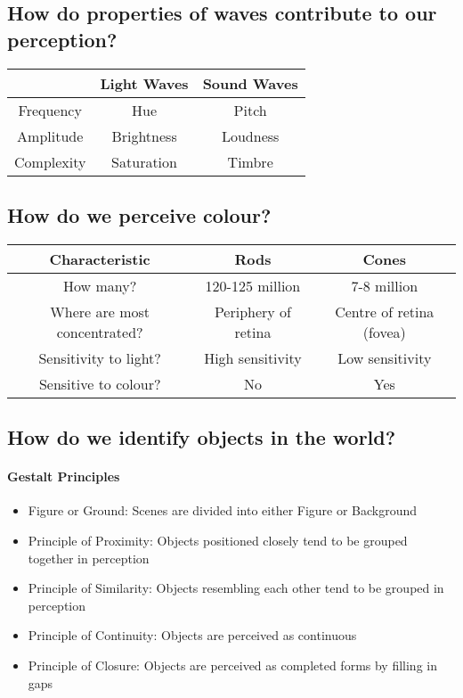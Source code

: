 \documentclass[10pt,letter]{article}
\theoremstyle{plain}
\theoremstyle{definition}
\begin{document}
\subsection*{How do properties of waves contribute to our perception?}
\begin{tabular}{|c|cc|}
\hline
&Light Waves&Sound Waves\\\hline 
Frequency & Hue & Pitch \\ 
Amplitude & Brightness & Loudness \\ 
Complexity & Saturation & Timbre\\
\hline
\end{tabular}

\subsection*{How do we perceive colour?}
\begin{tabular}{|c|cc|}
\hline
Characteristic & Rods & Cones\\\hline 
How many? & 120-125 million & 7-8 million \\ 
Where are most concentrated? & Periphery of retina & Centre of retina (fovea) \\ 
Sensitivity to light? & High sensitivity & Low sensitivity\\ 
Sensitive to colour? & No & Yes\\
\hline
\end{tabular}

\subsection*{How do we identify objects in the world?}
\paragraph{Gestalt Principles}
\begin{itemize}
    \item Figure or Ground: Scenes are divided into either Figure or Background 
    \item Principle of Proximity: Objects positioned closely tend to be grouped together in perception 
    \item Principle of Similarity: Objects resembling each other tend to be grouped in perception 
    \item Principle of Continuity: Objects are perceived as continuous 
    \item Principle of Closure: Objects are perceived as completed forms by filling in gaps
\end{itemize}
\end{document}

